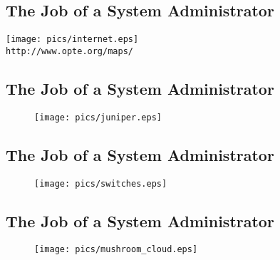 \documentclass[xga]{xdvislides}
\begin{document}
\subsection{The Job of a System Administrator}
\vspace*{\fill}
\begin{center}
	\texttt{[image: pics/internet.eps]} \\
	\small
	{\tt http://www.opte.org/maps/}
	\Normalsize
\end{center}
\vspace*{\fill}

\subsection{The Job of a System Administrator}
\vspace*{\fill}
\begin{figure}[hb]
	\begin{center}
		\texttt{[image: pics/juniper.eps]} \\
	\end{center}
\end{figure}
\vspace*{\fill}

\subsection{The Job of a System Administrator}
\vspace*{\fill}
\begin{figure}[hb]
	\begin{center}
		\texttt{[image: pics/switches.eps]} \\
	\end{center}
\end{figure}
\vspace*{\fill}

\subsection{The Job of a System Administrator}
\vspace*{\fill}
\begin{figure}[hb]
	\begin{center}
		\texttt{[image: pics/mushroom\_cloud.eps]} \\
	\end{center}
\end{figure}
\vspace*{\fill}
\end{document}
